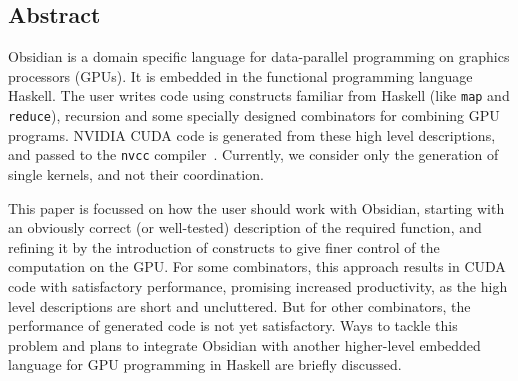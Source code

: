 





\subsection*{Abstract}
Obsidian is a domain specific language for data-parallel programming 
on graphics processors (GPUs). It is embedded in the functional 
programming language Haskell. The user writes code using constructs 
familiar from Haskell (like {\tt map} and {\tt reduce}), recursion 
and some specially designed combinators for combining GPU programs. 
NVIDIA CUDA code is generated from these high level descriptions, and 
passed to the {\tt nvcc} compiler~. Currently, we 
consider only the generation of single kernels, and not their coordination.

This paper is focussed on how the user should work with Obsidian, 
starting with an obviously correct (or well-tested) description of the 
required function, and refining it by the introduction of constructs to 
give finer control of the computation on the GPU. For some combinators, 
this approach results in CUDA code with satisfactory performance, promising 
increased productivity, as the high level descriptions are short and 
uncluttered. But for other combinators, the performance of generated code 
is not yet satisfactory. Ways to tackle this problem and plans to integrate 
Obsidian with another higher-level embedded language for GPU programming in 
Haskell are briefly discussed.





